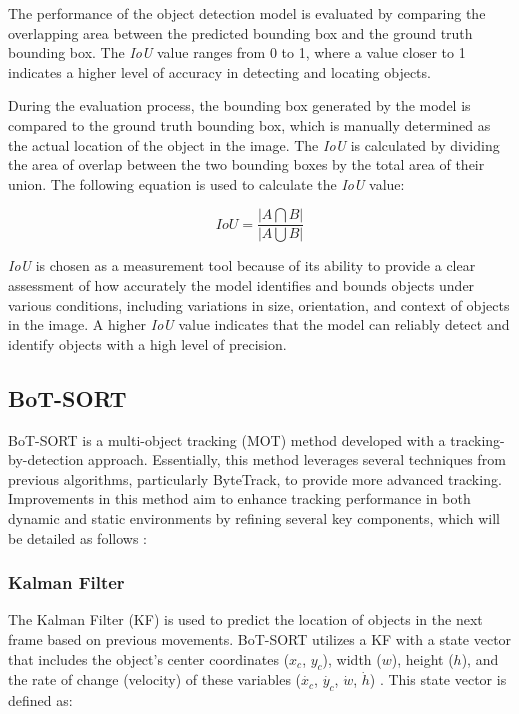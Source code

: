 The performance of the object detection model is evaluated by comparing the overlapping area between the predicted bounding box and the ground truth bounding box. The \emph{IoU} value ranges from 0 to 1, where a value closer to 1 indicates a higher level of accuracy in detecting and locating objects.

During the evaluation process, the bounding box generated by the model is compared to the ground truth bounding box, which is manually determined as the actual location of the object in the image. The \emph{IoU} is calculated by dividing the area of overlap between the two bounding boxes by the total area of their union. The following equation is used to calculate the \emph{IoU} value:

\begin{equation}
  IoU = \frac{\left |A \bigcap B \right |}{\left | A \bigcup B \right |}
\end{equation}

\emph{IoU} is chosen as a measurement tool because of its ability to provide a clear assessment of how accurately the model identifies and bounds objects under various conditions, including variations in size, orientation, and context of objects in the image. A higher \emph{IoU} value indicates that the model can reliably detect and identify objects with a high level of precision.

\subsection{BoT-SORT}

BoT-SORT is a multi-object tracking (MOT) method developed with a tracking-by-detection approach. Essentially, this method leverages several techniques from previous algorithms, particularly ByteTrack, to provide more advanced tracking. Improvements in this method aim to enhance tracking performance in both dynamic and static environments by refining several key components, which will be detailed as follows \cite{aharon2022botsortrobustassociationsmultipedestrian}:

\vspace{5pt}
\subsubsection{Kalman Filter}
\label{subsubsec:Kalman Filter}

The Kalman Filter (KF) is used to predict the location of objects in the next frame based on previous movements. BoT-SORT utilizes a KF with a state vector that includes the object's center coordinates ($x_c$, $y_c$), width ($w$), height ($h$), and the rate of change (velocity) of these variables ($\dot{x_c}$, $\dot{y_c}$, $\dot{w}$, $\dot{h}$) \cite{bewley2016simple, wojke2017simple}. This state vector is defined as:

